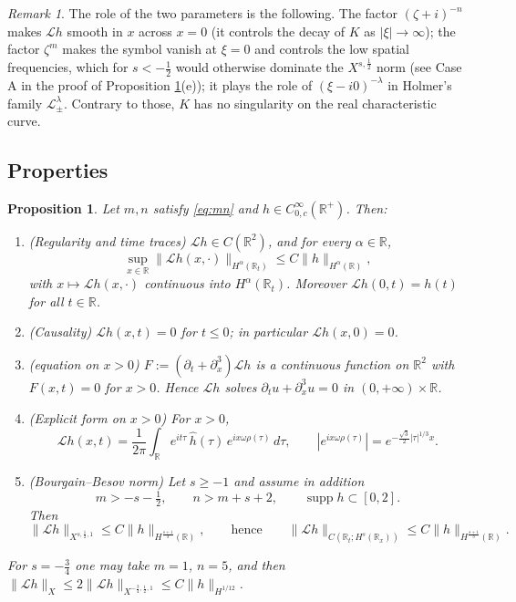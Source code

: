 \documentclass[10pt,reqno]{amsart}
\newtheorem{proposition}[theorem]{Proposition}
\theoremstyle{remark}
\newtheorem{remark}[theorem]{Remark}
\numberwithin{equation}{section}
\newcommand{\R}{\mathbb R}
\newcommand{\om}{\omega}
\newcommand{\pd}{\partial}
\newcommand{\la}{\lambda}
\newcommand{\supp}{\operatorname{supp}}
\newcommand{\Lc}{\mathcal{L}}
\begin{document}
\begin{remark}
The role of the two parameters is the following. The factor $(\zeta+i)^{-n}$ makes $\Lc h$ smooth in $x$ across $x=0$ (it controls the decay of $K$ as $|\xi|\to\infty$); the factor $\zeta^m$ makes the symbol vanish at $\xi=0$ and controls the low spatial frequencies, which for $s<-\frac12$ would otherwise dominate the $X^{s,\frac12}$ norm (see Case A in the proof of Proposition \ref{prop:L}(e)); it plays the role of $(\xi-i0)^{-\la}$ in Holmer's family $\Lc^\la_\pm$. Contrary to those, $K$ has no singularity on the real characteristic curve.
\end{remark}

\subsection{Properties}

\begin{proposition}\label{prop:L}
Let $m,n$ satisfy \eqref{eq:mn} and $h\in C^\infty_{0,c}(\R^+)$. Then:
\begin{enumerate}
\item[(a)] (\emph{Regularity and time traces}) $\Lc h\in C(\R^2)$, and for every $\alpha\in\R$,
$$\sup_{x\in\R}\|\Lc h(x,\cdot)\|_{H^\alpha(\R_t)}\le C\|h\|_{H^\alpha(\R)},$$
with $x\mapsto\Lc h(x,\cdot)$ continuous into $H^\alpha(\R_t)$. Moreover $\Lc h(0,t)=h(t)$ for all $t\in\R$.
\item[(b)] (\emph{Causality}) $\Lc h(x,t)=0$ for $t\le0$; in particular $\Lc h(x,0)=0$.
\item[(c)] (\emph{equation on $x>0$}) $F:=(\pd_t+\pd_x^3)\Lc h$ is a continuous function on $\R^2$ with $F(x,t)=0$ for $x>0$. Hence $\Lc h$ solves $\pd_tu+\pd_x^3u=0$ in $(0,+\infty)\times\R$.
\item[(d)] (\emph{Explicit form on $x>0$}) For $x>0$,
$$\Lc h(x,t)=\frac1{2\pi}\int_\R e^{it\tau}\,\widehat h(\tau)\,e^{ix\om\rho(\tau)}\,d\tau,\qquad |e^{ix\om\rho(\tau)}|=e^{-\frac{\sqrt3}2|\tau|^{1/3}x}.$$
\item[(e)] (\emph{Bourgain--Besov norm}) Let $s\ge-1$ and assume in addition
\begin{equation}\label{eq:mn2}
m>-s-\tfrac12,\qquad n>m+s+2,\qquad \supp h\subset[0,2].
\end{equation}
Then
$$\|\Lc h\|_{X^{s,\frac12,1}}\le C\|h\|_{H^{\frac{s+1}3}(\R)},\qquad\text{hence}\qquad \|\Lc h\|_{C(\R_t;H^s(\R_x))}\le C\|h\|_{H^{\frac{s+1}3}(\R)} .$$
\end{enumerate}
For $s=-\frac34$ one may take $m=1$, $n=5$, and then $\|\Lc h\|_X\le2\|\Lc h\|_{X^{-\frac34,\frac12,1}}\le C\|h\|_{H^{1/12}}$.
\end{proposition}
\end{document}
